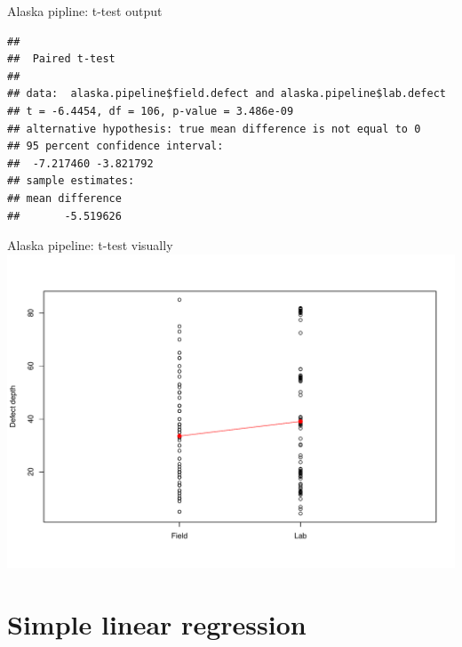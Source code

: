 \documentclass[
  ignorenonframetext,
]{beamer}
\begin{document}
\begin{frame}[fragile]{Alaska pipline: t-test output}
\label{alaska-pipline-t-test-output}
\small

\begin{codebox}

\begin{verbatim}
## 
##  Paired t-test
## 
## data:  alaska.pipeline$field.defect and alaska.pipeline$lab.defect
## t = -6.4454, df = 106, p-value = 3.486e-09
## alternative hypothesis: true mean difference is not equal to 0
## 95 percent confidence interval:
##  -7.217460 -3.821792
## sample estimates:
## mean difference 
##       -5.519626
\end{verbatim}

\end{codebox}
\end{frame}

\begin{frame}{Alaska pipeline: t-test visually}
\label{alaska-pipeline-t-test-visually}
\includegraphics{IntroLM_files/figure-beamer/unnamed-chunk-11-1.pdf}
\end{frame}

\section{Simple linear regression}\label{simple-linear-regression}
\end{document}
